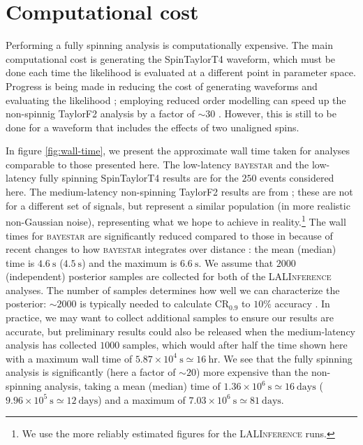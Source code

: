 \appendix

\section{Computational cost}\label{ap:CPU}

Performing a fully spinning analysis is computationally expensive. The main computational cost is generating the SpinTaylorT4 waveform, which must be done each time the likelihood is evaluated at a different point in parameter space. Progress is being made in reducing the cost of generating waveforms and evaluating the likelihood \citep[e.g.,][]{Canizares_2013,P_rrer_2014}; employing reduced order modelling can speed up the non-spinnig TaylorF2 analysis by a factor of $\sim 30$ \citep{Canizares_2015}. However, this is still to be done for a waveform that includes the effects of two unaligned spins.

In figure \ref{fig:wall-time}, we present the approximate wall time taken for analyses comparable to those presented here. The low-latency \textsc{bayestar} and the low-latency fully spinning SpinTaylorT4 results are for the $250$ events considered here. The medium-latency non-spinning TaylorF2 results are from \citet{Berry_2014}; these are not for a different set of signals, but represent a similar population (in more realistic non-Gaussian noise), representing what we hope to achieve in reality.\footnote{We use the more reliably estimated figures for the \textsc{LALInference} runs.} The wall times for \textsc{bayestar} are significantly reduced compared to those in \citet{Berry2015} because of recent changes to how \textsc{bayestar} integrates over distance \citep{SingerPrice2015}: the mean (median) time is $4.6~\mathrm{s}$ ($4.5~\mathrm{s}$) and the maximum is $6.6~\mathrm{s}$.  We assume that $2000$ (independent) posterior samples are collected for both of the \textsc{LALInference} analyses. The number of samples determines how well we can characterize the posterior: $\sim2000$ is typically needed to calculate $\mathrm{CR}_{0.9}$ to $10\%$ accuracy \citep{DelPozzo_2015}. In practice, we may want to collect additional samples to ensure our results are accurate, but preliminary results could also be released when the medium-latency analysis has collected $1000$ samples, which would after half the time shown here with a maximum wall time of $5.87\times10^4~\mathrm{s} \simeq 16~\mathrm{hr}$. We see that the fully spinning analysis is significantly (here a factor of $\sim20$) more expensive than the non-spinning analysis, taking a mean (median) time of $1.36\times10^6~\mathrm{s} \simeq 16~\mathrm{days}$ ($9.96\times10^5~\mathrm{s} \simeq 12~\mathrm{days}$) and a maximum of $7.03\times10^6~\mathrm{s} \simeq 81~\mathrm{days}$.

